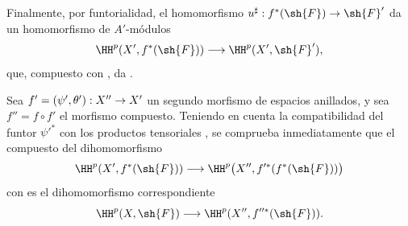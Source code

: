\documentclass[oneside]{amsart}
\makeatletter
\newcommand{\ega@arrow}[2]{\mathchoice{#1}{#2}{#2}{#2}}
\renewcommand{\to}{\ega@arrow{\longrightarrow}{\rightarrow}}
\makeatother
\begin{document}
\begin{env}[12.1.3]
Finalmente, por funtorialidad, el homomorfismo
$u^\sharp:f^*(\sh{F})\to\sh{F}'$ da un homomorfismo de
$A'$-módulos
\[
  \HH^p(X',f^*(\sh{F}))
  \longrightarrow
  \HH^p(X',\sh{F}'),
\]
que, compuesto con , da
.

Sea $f'=(\psi',\theta'):X''\to X'$ un segundo morfismo de espacios
anillados, y sea $f''=f\circ f'$ el morfismo compuesto.
Teniendo en cuenta la compatibilidad del funtor $\psi'^*$ con los
productos tensoriales , se comprueba
inmediatamente que el compuesto del dihomomorfismo
\[
  \HH^p(X',f^*(\sh{F}))
  \longrightarrow
  \HH^p\bigl(X'',f'^*(f^*(\sh{F}))\bigr)
\]
con  es el dihomomorfismo correspondiente
\[
  \HH^p(X,\sh{F})
  \longrightarrow
  \HH^p(X'',f''^*(\sh{F})).
\]
\end{env}
\end{document}
